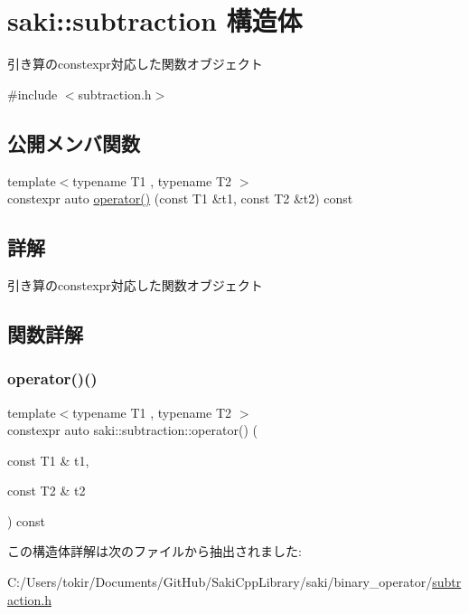 \hypertarget{structsaki_1_1subtraction}{}\section{saki\+:\+:subtraction 構造体}
\label{structsaki_1_1subtraction}


引き算のconstexpr対応した関数オブジェクト  




{\ttfamily \#include $<$subtraction.\+h$>$}

\subsection*{公開メンバ関数}
\begin{DoxyCompactItemize}
\item 
{\footnotesize template$<$typename T1 , typename T2 $>$ }\\constexpr auto \mbox{\hyperlink{structsaki_1_1subtraction_a6c26b497569ef8b5fd7aa213ca675a2c}{operator()}} (const T1 \&t1, const T2 \&t2) const
\end{DoxyCompactItemize}


\subsection{詳解}
引き算のconstexpr対応した関数オブジェクト 

\subsection{関数詳解}
\mbox{\label{structsaki_1_1subtraction_a6c26b497569ef8b5fd7aa213ca675a2c}} 
\subsubsection{\texorpdfstring{operator()()}{operator()()}}
{\footnotesize\ttfamily template$<$typename T1 , typename T2 $>$ \\
constexpr auto saki\+::subtraction\+::operator() (\begin{DoxyParamCaption}\item[{const T1 \&}]{t1,  }\item[{const T2 \&}]{t2 }\end{DoxyParamCaption}) const\hspace{0.3cm}{\ttfamily [inline]}}



この構造体詳解は次のファイルから抽出されました\+:\begin{DoxyCompactItemize}
\item 
C\+:/\+Users/tokir/\+Documents/\+Git\+Hub/\+Saki\+Cpp\+Library/saki/binary\+\_\+operator/\mbox{\hyperlink{subtraction_8h}{subtraction.\+h}}\end{DoxyCompactItemize}
